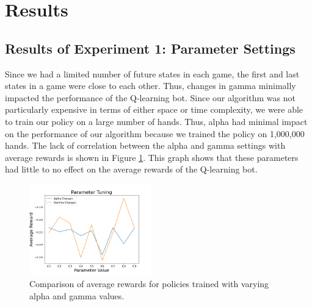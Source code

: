 
\section{Results}
\label{sec:results}



\subsection{Results of Experiment 1: Parameter Settings}
\label{sec:resE1}
Since we had a limited number of future states in each game, the first and last states in a game were close to each other. Thus, changes in gamma minimally impacted the performance of the Q-learning bot. Since our algorithm was not particularly expensive in terms of either space or time complexity, we were able to train our policy on a large number of hands. Thus, alpha had minimal impact on the performance of our algorithm because we trained the policy on 1,000,000 hands. The lack of correlation between the alpha and gamma settings with average rewards is shown in Figure \ref{hpFig}. This graph shows that these parameters had little to no effect on the average rewards of the Q-learning bot. 

\begin{figure}[htb]

  \centering  %

  \includegraphics[width=0.47\textwidth]{hpTuning.png}


  \caption{Comparison of average rewards for policies trained with varying alpha and gamma values.}

  \label{hpFig}

\end{figure}

